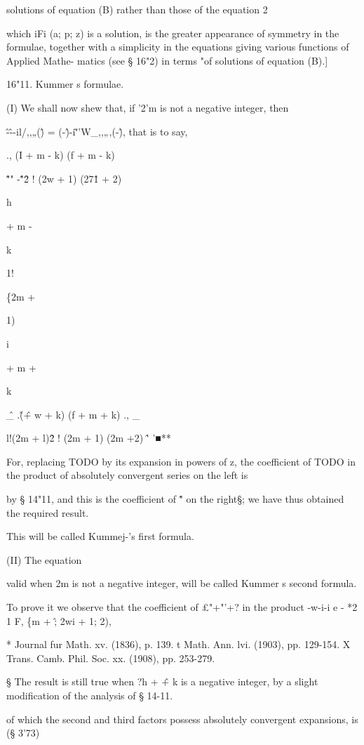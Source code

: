 solutions of equation (B) rather than those of the equation 2

which iFi (a; p; z) is a solution, is the greater appearance of
symmetry in the formulae, together with a simplicity in the equations
giving various functions of Applied Mathe- matics (see § 16"2) in
terms "of solutions of equation (B).]

16"11. Kummer s formulae.

(I) We shall now shew that, if '2'm is not a negative integer, then

\^-\^--il/,,„(\^) = (-\^)-i\~''W\_,,„,(-\^), that is to say,

., (I + m - k) (f + m - k)

\^ "" -\^"\^ 2 ! (2w + 1) (27\^1 + 2)

h

+ m -

k

1!

\{2m +

1)

i

+ m +

k

\^ \_ .\^ (\^ + w + k) (f + m + k) ., \_

l!(2m + l)\^ 2 ! (2m + 1) (2m +2) \^' '■**

For, replacing TODO by its expansion in powers of z, the coefficient
of TODO in the product of absolutely convergent series on the left is

by § 14"11, and this is the coefficient of \^" on the right§; we have
thus obtained the required result.

This will be called Kummej-'s first formula.

(II) The equation

valid when 2m is not a negative integer, will be called Kummer s
second formula.

To prove it we observe that the coefficient of £"+"'+? in the product
-w-i-i e - *2 1 F, \{m + \^; 2wi + 1; 2),

* Journal fur Math. xv. (1836), p. 139. t Math. Ann. lvi. (1903), pp.
129-154. X Trans. Camb. Phil. Soc. xx. (1908), pp. 253-279.

§ The result is still true when ?h + \^ + k is a negative integer, by
a slight modification of the analysis of § 14-11.

%
%

of which the second and third factors possess absolutely convergent
expansions, is (§ 3'73)

